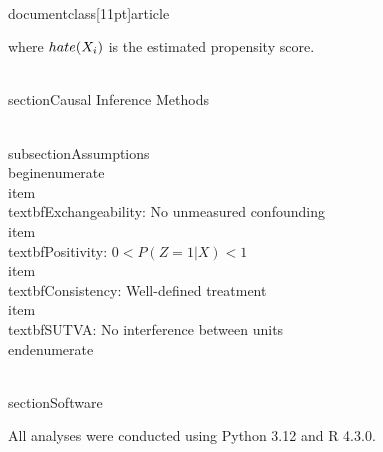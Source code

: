 \\documentclass[11pt]{article}
\begin{document}
where $\\hat{e}(X_i)$ is the estimated propensity score.

\\section{Causal Inference Methods}

\\subsection{Assumptions}
\\begin{enumerate}
    \\item \\textbf{Exchangeability}: No unmeasured confounding
    \\item \\textbf{Positivity}: $0 < P(Z=1|X) < 1$
    \\item \\textbf{Consistency}: Well-defined treatment
    \\item \\textbf{SUTVA}: No interference between units
\\end{enumerate}

\\section{Software}

All analyses were conducted using Python 3.12 and R 4.3.0.

\
\end{document}
